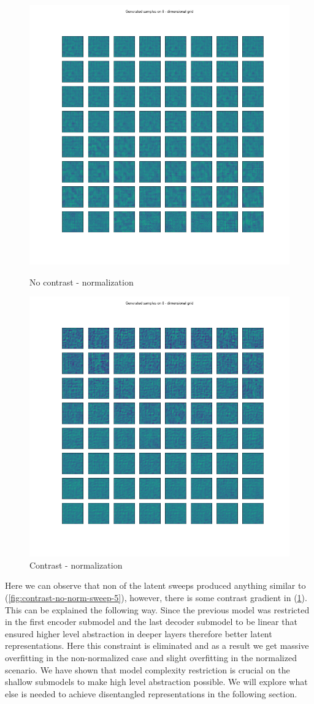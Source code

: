 \documentclass[12pt, english]{article}
\begin{document}
\begin{figure}[H]
  \begin{minipage}{0.5\linewidth}
    \centering
    \includegraphics[width=.62\linewidth]{lvae2/contrast_norm_no_contrast_sweep.png} 
    \caption{No contrast - normalization} 
    \label{fig:no-contrast-norm-sweep}
  \end{minipage}%
  \begin{minipage}{0.5\linewidth}
    \centering
    \includegraphics[width=.62\linewidth]{lvae2/contrast_norm_contrast_sweep.png} 
    \caption{Contrast - normalization} 
    \label{fig:contrast-norm-sweep}
  \end{minipage} 
\end{figure}

\vspace{4mm}

\par Here we can observe that non of the latent sweeps produced anything similar to (\ref{fig:contrast-no-norm-sweep-5}), however, there is some contrast gradient in (\ref{fig:contrast-norm-sweep}). This can be explained the following way. Since the previous model was restricted in the first encoder submodel and the last decoder submodel to be linear that ensured higher level abstraction in deeper layers therefore better latent representations. Here this constraint is eliminated and as a result we get massive overfitting in the non-normalized case and slight overfitting in the normalized scenario. We have shown that model complexity restriction is crucial on the shallow submodels to make high level abstraction possible. We will explore what else is needed to achieve disentangled representations in the following section.
\end{document}
